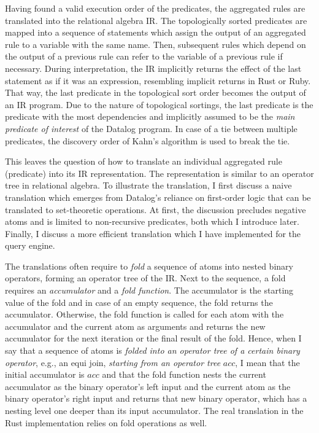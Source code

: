 Having found a valid execution order of the predicates,
the aggregated rules are translated into the relational algebra \ac{IR}.
The topologically sorted predicates are mapped into a sequence of statements
which assign the output of an aggregated rule to a variable with the same name.
Then, subsequent rules which depend on the output of a previous rule can refer
to the variable of a previous rule if necessary.
During interpretation, the \ac{IR} implicitly returns the effect
of the last statement as if it was an expression,
resembling implicit returns in Rust or Ruby.
That way, the last predicate in the topological sort order becomes the output
of an \ac{IR} program.
Due to the nature of topological sortings, the last predicate is the
predicate with the most dependencies and implicitly assumed to be the
\emph{main predicate of interest} of the Datalog program.
In case of a tie between multiple predicates, the discovery order of Kahn's
algorithm is used to break the tie\footnotemark{}.


This leaves the question of how to translate an individual aggregated rule
(predicate) into its \ac{IR} representation.
The representation is similar to an operator tree in relational algebra.
To illustrate the translation, I first discuss a naive translation
which emerges from Datalog's reliance on first-order logic that can be
translated to set-theoretic operations.
At first, the discussion precludes negative atoms and is limited to
non-recursive predicates, both which I introduce later.
Finally, I discuss a more efficient translation which I have implemented for
the query engine.

The translations often require to \emph{fold} a sequence of atoms into
nested binary operators, forming an operator tree of the \ac{IR}.
Next to the sequence, a fold requires an \emph{accumulator} and a \emph{fold function}.
The accumulator is the starting value of the fold and in case of an empty
sequence, the fold returns the accumulator.
Otherwise, the fold function is called for each atom with the accumulator
and the current atom as arguments and returns the new accumulator for the next
iteration or the final result of the fold.
Hence, when I say that a sequence of atoms is
\emph{folded into an operator tree of a certain binary operator}, e.g., an equi join,
\emph{starting from an operator tree} \(\mathit{acc}\), I mean that the initial
accumulator is \(\mathit{acc}\) and that the fold function nests the current
accumulator as the binary operator's left input and the current atom as the
binary operator's right input and returns that new binary operator,
which has a nesting level one deeper than its input accumulator.
The real translation in the Rust implementation relies on fold operations as well.

